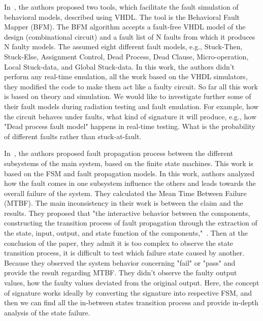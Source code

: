 In~\citep{hayne1999behavioral}, the authors proposed two tools, which facilitate the fault simulation of behavioral
models, described using VHDL. The tool is the Behavioral Fault Mapper (BFM). The BFM algorithm
accepts a fault-free VHDL model of the design (combinational circuit) and a fault list of N faults from
which it produces N faulty models. The assumed eight different fault models, e.g., Stuck-Then, Stuck-Else,
Assignment Control, Dead Process, Dead Clause, Micro-operation, Local Stuck-data, and Global Stuck-data.  In this work, the authors didn't perform any real-time emulation, all the work based on the VHDL simulators, they modified the code to make them act like a  faulty circuit. So far all this work is based on theory and simulation. We would like to investigate further some of their fault models during radiation testing and fault emulation. For example, how the circuit behaves under faults, what kind of signature it will produce, e.g.,  how "Dead process fault model" happens in real-time testing.  What is the probability of different faults rather than stuck-at-fault.

In~\citep{chen2017fault}, the authors proposed fault propagation process between the different subsystems of the
main system, based on the finite state machines. This work is based on the FSM and fault propagation models. In this work, authors analyzed how the fault comes in one subsystem influence the others and leads towards the overall failure of the system. They calculated the Mean Time Between Failure (MTBF). The main inconsistency in their work is between the claim and the results. They proposed that "the interactive behavior between the components, constructing the transition process of fault propagation through the extraction of the state, input, output, and state function of the components,"~\citep{chen2017fault}. Then at the conclusion of the paper, they admit it is too complex to observe the state transition process, it is difficult to test which failure state caused by another. Because they observed the system behavior concerning "fail" or "pass"  and provide the result regarding  MTBF. They didn't observe the faulty output values, how the faulty values deviated from the original output. Here, the concept of signature works ideally by converting the signature into respective FSM, and then we can find all the in-between states transition process and provide in-depth analysis of the state failure. 
 
